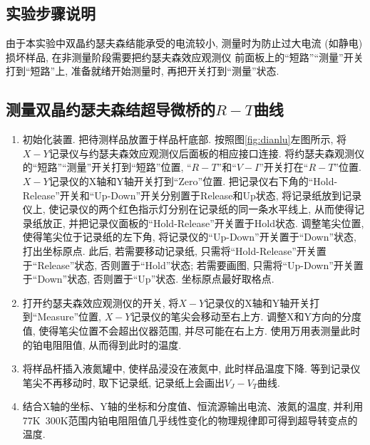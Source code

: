 \documentclass[font=default]{mpltx}
\newcommand{\note}[1]{{\color{gray}#1}}
\newcommand*\cs[1]{\texttt{\textbackslash #1}}
\begin{document}


\subsection{实验步骤说明}
由于本实验中双晶约瑟夫森结能承受的电流较小, 测量时为防止过大电流 (如静电) 损坏样品, 在非测量阶段需要把约瑟夫森效应观测仪 前面板上的“短路”“测量”开关打到“短路”上, 准备就绪开始测量时, 再把开关打到“测量”状态.

\subsection{测量双晶约瑟夫森结超导微桥的$R-T$曲线}
\begin{enumerate}
  \item 初始化装置. 把待测样品放置于样品杆底部. 按照图\autoref{fig:dianlu}左图所示, 将$X-Y$记录仪与约瑟夫森效应观测仪后面板的相应接口连接. 将约瑟夫森观测仪的“短路”“测量”开关打到“短路”位置, “$R-T$”和“$V-I$”开关打在“$R-T$”位置. 
  $X-Y$记录仪的X轴和Y轴开关打到“Zero”位置. 把记录仪右下角的“Hold-Release”开关和“Up-Down”开关分别置于Release和Up状态, 将记录纸放到记录仪上, 使记录仪的两个红色指示灯分别在记录纸的同一条水平线上, 从而使得记录纸放正, 并把记录仪面板的“Hold-Release”开关置于Hold状态. 
  调整笔尖位置, 使得笔尖位于记录纸的左下角, 将记录仪的“Up-Down”开关置于“Down”状态, 打出坐标原点. 此后, 若需要移动记录纸, 只需将“Hold-Release”开关置于“Release”状态, 否则置于“Hold”状态; 若需要画图, 只需将“Up-Down”开关置于“Down”状态, 否则置于“Up”状态. 坐标原点最好取格点.

  \item 打开约瑟夫森效应观测仪的开关,  将$X-Y$记录仪的X轴和Y轴开关打到“Measure”位置, $X-Y$记录仪的笔尖会移动至右上方. 调整X和Y方向的分度值, 使得笔尖位置不会超出仪器范围, 并尽可能在右上方. 使用万用表测量此时的铂电阻阻值, 从而得到此时的温度. 
  \item 将样品杆插入液氮罐中, 使样品浸没在液氮中, 此时样品温度下降. 等到记录仪笔尖不再移动时, 取下记录纸, 记录纸上会画出$V_J-V_T$曲线. 
  \item 结合X轴的坐标、Y轴的坐标和分度值、恒流源输出电流、液氮的温度, 并利用77K~300K范围内铂电阻阻值几乎线性变化的物理规律即可得到超导转变点的温度. 
\end{enumerate}
\end{document}
